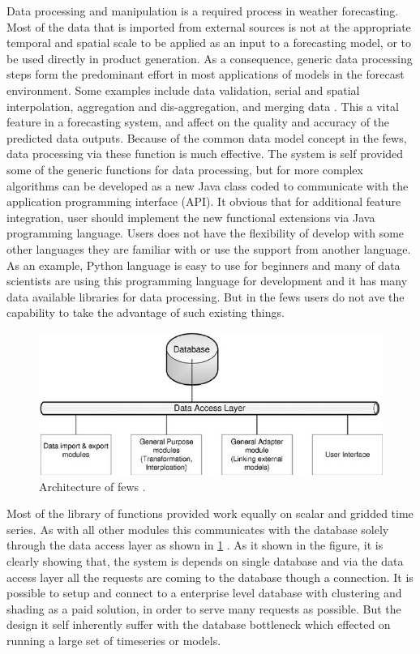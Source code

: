 Data processing and manipulation is a required process in weather forecasting. Most of the data that is imported from external sources is not at the appropriate temporal and spatial scale to be applied as an input to a forecasting model, or to be used directly in product generation. As a consequence, generic data processing steps form the predominant effort in most applications of models in the forecast environment. Some examples include data validation, serial and spatial interpolation, aggregation and dis-aggregation, and merging data \cite{Werner2013TheSystem}. This a vital feature in a forecasting system, and affect on the quality and accuracy of the predicted data outputs. Because of the common data model concept in the \acrshort{fews}, data processing via these function is much effective. The system is self provided some of the generic functions for data processing, but for more complex algorithms can be developed as a new Java class coded to communicate with the application programming interface (API). It obvious that for additional feature integration, user should implement the new functional extensions via Java programming language. Users does not have the flexibility of develop with some other languages they are familiar with or use the support from another language. As an example, Python language is easy to use for beginners and many of data scientists are using this programming language for development and it has many data available libraries for data processing. But in the \acrshort{fews} users do not ave the capability to take the advantage of such existing things.

\begin{figure}[htp]
    \centering
    \includegraphics[width=1.0\textwidth]{lit/fews/Architecture-of-Delft-FEWS-showing-the-data-base-the-data-access-layers-and-examples-of_W640.jpg}
    \caption[Architecture of \acrshort{fews}]{Architecture of \acrshort{fews} \cite{Werner2013TheSystem}.}
    \label{fi:fews_data_layer}
\end{figure}
Most of the library of functions provided work equally on scalar and gridded time series. As with all other modules this communicates with the database solely through the data access layer as shown in \ref{fi:fews_data_layer} \cite{Werner2013TheSystem}. As it shown in the figure, it is clearly showing that, the system is depends on single database and via the data access layer all the requests are coming to the database though a connection. It is possible to setup and connect to a enterprise level database with clustering and shading as a paid solution, in order to serve many requests as possible. But the design it self inherently suffer with the database bottleneck which effected on running a large set of timeseries or models.

